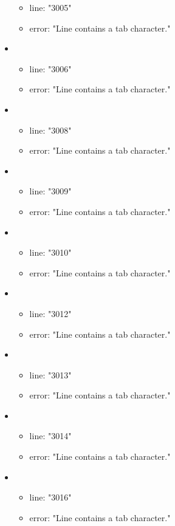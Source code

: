 \begin{itemize}
\begin{itemize}
		\item line: "3005" 
		\item error: "Line contains a tab character." 
	\end{itemize}
	\item 
	\begin{itemize} 
		\item line: "3006" 
		\item error: "Line contains a tab character." 
	\end{itemize}
	\item 
	\begin{itemize} 
		\item line: "3008" 
		\item error: "Line contains a tab character." 
	\end{itemize}
	\item 
	\begin{itemize} 
		\item line: "3009" 
		\item error: "Line contains a tab character." 
	\end{itemize}
	\item 
	\begin{itemize} 
		\item line: "3010" 
		\item error: "Line contains a tab character." 
	\end{itemize}
	\item 
	\begin{itemize} 
		\item line: "3012" 
		\item error: "Line contains a tab character." 
	\end{itemize}
	\item 
	\begin{itemize} 
		\item line: "3013" 
		\item error: "Line contains a tab character." 
	\end{itemize}
	\item 
	\begin{itemize} 
		\item line: "3014" 
		\item error: "Line contains a tab character." 
	\end{itemize}
	\item 
	\begin{itemize} 
		\item line: "3016" 
		\item error: "Line contains a tab character." 

\end{itemize}
\end{itemize}
